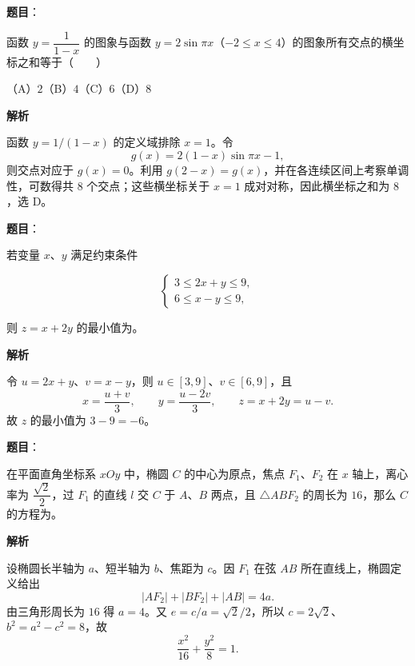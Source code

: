 \begin{answer}

\textbf{题目}：

函数 $y=\dfrac1{1-x}$ 的图象与函数 $y=2\sin\pi x$（$-2\leq x\leq4$）的图象所有交点的横坐标之和等于\mbox{（　　）}

（A）$2$\quad（B）$4$\quad（C）$6$\quad（D）$8$

\textbf{解析}

函数 $y=1/(1-x)$ 的定义域排除 $x=1$。令
\nopagebreak[4]
\[
g(x)=2(1-x)\sin\pi x-1,
\]
则交点对应于 $g(x)=0$。利用 $g(2-x)=g(x)$，并在各连续区间上考察单调性，可数得共 $8$ 个交点；这些横坐标关于 $x=1$ 成对对称，因此横坐标之和为 $8$，选 D。


\end{answer}
\begin{answer}

\textbf{题目}：

若变量 $x\text{、}y$ 满足约束条件

\nopagebreak[4]
\[
\begin{cases}
3\leq2x+y\leq9,\\
6\leq x-y\leq9,
\end{cases}
\]

则 $z=x+2y$ 的最小值为\gkblank{}。

\textbf{解析}

令 $u=2x+y$、$v=x-y$，则 $u\in[3,9]$、$v\in[6,9]$，且
\nopagebreak[4]
\[
x=\frac{u+v}{3},\qquad y=\frac{u-2v}{3},\qquad z=x+2y=u-v.
\]
故 $z$ 的最小值为 $3-9=-6$。


\end{answer}
\begin{answer}

\textbf{题目}：

在平面直角坐标系 $xOy$ 中，椭圆 $C$ 的中心为原点，焦点 $F_1\text{、}F_2$ 在 $x$ 轴上，离心率为 $\dfrac{\sqrt2}{2}$，过 $F_1$ 的直线 $l$ 交 $C$ 于 $A\text{、}B$ 两点，且 $\triangle ABF_2$ 的周长为 $16$，那么 $C$ 的方程为\gkblank{}。

\textbf{解析}

设椭圆长半轴为 $a$、短半轴为 $b$、焦距为 $c$。因 $F_1$ 在弦 $AB$ 所在直线上，椭圆定义给出
\nopagebreak[4]
\[
|AF_2|+|BF_2|+|AB|=4a.
\]
由三角形周长为 $16$ 得 $a=4$。又 $e=c/a=\sqrt2/2$，所以 $c=2\sqrt2$、$b^2=a^2-c^2=8$，故
\nopagebreak[4]
\[
\frac{x^2}{16}+\frac{y^2}{8}=1.
\]


\end{answer}
